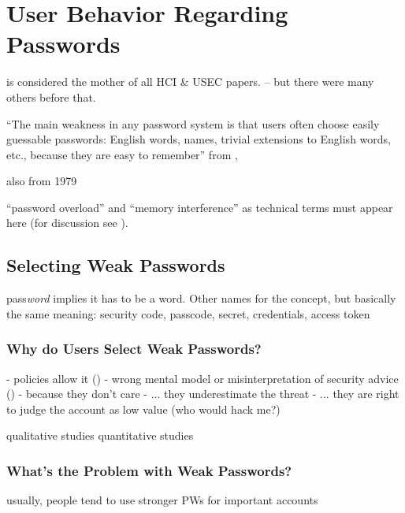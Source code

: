 	\cite{Huha2015UserReplaceablePasswords}

	
\section{User Behavior Regarding Passwords}
\label{sec:rw:how-users-cope}


\cite{Adams1999UsersEnemy} is considered the mother of all HCI \& USEC papers. -- but there were many others before that.

``The main weakness in any password system is that users often choose easily guessable passwords: English words, names, trivial extensions to English words, etc., because they are easy to remember'' from \cite{Feldmeier1990UnixPasswordSecurity},

also \cite{Morris1979PasswordSecurity} from 1979


``password overload'' and ``memory interference'' as technical terms must appear here (for discussion see \cite{Yang2016MnemonicSentenceBased}).

	\subsection{Selecting Weak Passwords}

	pass\textit{word} implies it has to be a word. Other names for the concept, but basically the same meaning: security code, passcode, secret, credentials, access token
	

		\subsubsection{Why do Users Select Weak Passwords?}
	
	- policies allow it (\cite{Seitz2017PoliciesReuse})
	- wrong mental model or misinterpretation of security advice (\cite{Ur2015PWCreationLab, Ur2016PerceptionsPassword, Seitz2017PASDJO})
	- because they don't care
	- ... they underestimate the threat
	- ... they are right to judge the account as low value (who would hack me?) \cite{LastPass2016PersonalitiesGetUsHacked}
	
	
	qualitative studies \cite{Ur2015PWCreationLab, Stobert2014PasswordLifeCycle} 
	quantitative studies \cite{Ur2016PerceptionsPassword, Seitz2017PASDJO}
	
	\subsubsection{What's the Problem with Weak Passwords?}
	usually, people tend to use stronger PWs for important accounts

